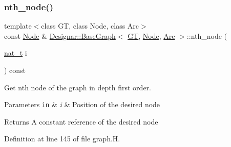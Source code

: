 \subsubsection{\texorpdfstring{nth\+\_\+node()}{nth\_node()}\hspace{0.1cm}{\footnotesize\ttfamily [2/2]}}
{\footnotesize\ttfamily template$<$class GT, class Node, class Arc$>$ \\
const \hyperlink{namespace_designar_a5af326c65aa2bd26b26c410f2030d09e}{Node} \& \hyperlink{class_designar_1_1_base_graph}{Designar\+::\+Base\+Graph}$<$ \hyperlink{demo-buildgraph_8_c_a3001c40d2c31ca87ed96cd7d1334a55e}{GT}, \hyperlink{namespace_designar_a5af326c65aa2bd26b26c410f2030d09e}{Node}, \hyperlink{namespace_designar_a3f55fb5513d62ff47cbc8f72b8e95d6f}{Arc} $>$\+::nth\+\_\+node (\begin{DoxyParamCaption}\item[{\hyperlink{namespace_designar_aa72662848b9f4815e7bf31a7cf3e33d1}{nat\+\_\+t}}]{i }\end{DoxyParamCaption}) const\hspace{0.3cm}{\ttfamily [inline]}}



Get nth node of the graph in depth first order. 


\begin{DoxyParams}[1]{Parameters}
\mbox{\tt in}  & {\em i} & Position of the desired node \\
\hline
\end{DoxyParams}
\begin{DoxyReturn}{Returns}
A constant reference of the desired node 
\end{DoxyReturn}


Definition at line 145 of file graph.\+H.

\mbox{\label{class_designar_1_1_base_graph_af1653bc8e50c53d27997951798a8a716}} 
